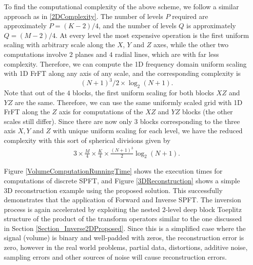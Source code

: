 \documentclass{UCF_ETD}
\begin{document}
 To find the computational complexity of the above scheme, we follow a similar approach as in \eqref{2DComplexity}. The number of levels $P$ required are approximately $P = (K-2)/4$, and the number of levels $Q$ is approximately $Q = (M-2)/4$. At every level the most expensive operation is the first uniform scaling with arbitrary scale along
 the $X$, $Y$ and $Z$ axes, while the other two computations involve $2$ planes and $4$ radial lines, which are with far less complexity. Therefore, we can compute the 1D frequency domain uniform scaling with 1D FrFT along any axis of any scale, and the corresponding complexity is
 $$(N+1)^3/2\times \log_2(N+1).$$
 Note that out of the $4$ blocks, the first uniform scaling for both blocks $XZ$ and $YZ$ are the same.
 Therefore, we can use the same uniformly scaled grid with 1D FrFT along the $Z$ axis for  computations of the $XZ$ and $YZ$ blocks (the other scales still differ). Since there are now only $3$ blocks corresponding to the three axis $X, Y$ and $Z$ with unique uniform scaling for each level, we have the reduced complexity with this sort of spherical divisions given by
 \begin{eqnarray} \label{3DComplexity}
 3\times \frac{M}{4}\times \frac{K}{4}\times\frac{(N+1)^3}{2}\log_2(N+1).
 \end{eqnarray}
 
 Figure \ref{VolumeComputationRunningTime} shows the execution times for computations of discrete SPFT, and Figure \ref{3DReconstruction} shows a simple 3D reconstruction example using the proposed solution. This successfully demonstrates that the application of Forward and Inverse SPFT. The inversion process is again accelerated by exploiting the nested $2$-level deep block Toeplitz structure of the product of the transform operators similar to the one discussed in Section \ref{Section_Inverse2DProposed}. Since this is a simplified case where the signal (volume) is binary and well-padded with zeros, the reconstruction error is zero, however in the real world problems, partial data, distortions, additive noise, sampling errors and other sources of noise will cause reconstruction errors.
 
\end{document}
